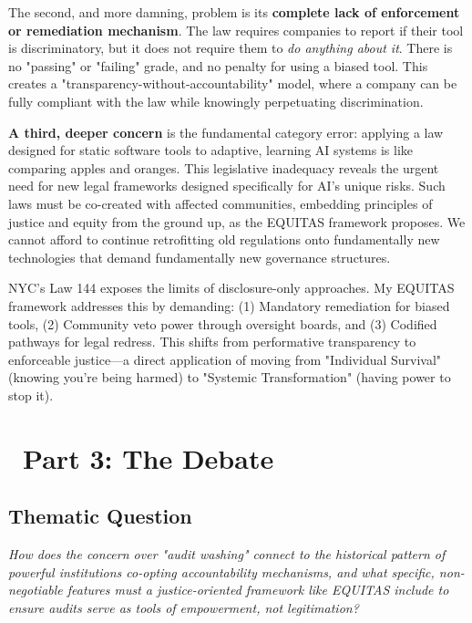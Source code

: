 \documentclass[12pt,letterpaper]{article}
\begin{document}
The second, and more damning, problem is its \textbf{complete lack of enforcement or remediation mechanism}. The law requires companies to report if their tool is discriminatory, but it does not require them to \textit{do anything about it}. There is no "passing" or "failing" grade, and no penalty for using a biased tool. This creates a "transparency-without-accountability" model, where a company can be fully compliant with the law while knowingly perpetuating discrimination.

\textbf{A third, deeper concern} is the fundamental category error: applying a law designed for static software tools to adaptive, learning AI systems is like comparing apples and oranges. This legislative inadequacy reveals the urgent need for new legal frameworks designed specifically for AI's unique risks. Such laws must be co-created with affected communities, embedding principles of justice and equity from the ground up, as the EQUITAS framework proposes. We cannot afford to continue retrofitting old regulations onto fundamentally new technologies that demand fundamentally new governance structures.

\begin{puzzleplan}
NYC's Law 144 exposes the limits of disclosure-only approaches. My EQUITAS framework addresses this by demanding: (1) Mandatory remediation for biased tools, (2) Community veto power through oversight boards, and (3) Codified pathways for legal redress. This shifts from performative transparency to enforceable justice—a direct application of moving from "Individual Survival" (knowing you're being harmed) to "Systemic Transformation" (having power to stop it).
\end{puzzleplan}

\newpage

\section*{\color{primaryblue}\faComments\ Part 3: The Debate}

\subsection*{Thematic Question}
\textit{How does the concern over "audit washing" connect to the historical pattern of powerful institutions co-opting accountability mechanisms, and what specific, non-negotiable features must a justice-oriented framework like EQUITAS include to ensure audits serve as tools of empowerment, not legitimation?}
\end{document}
